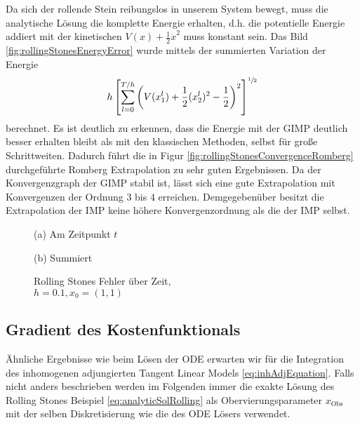 Da sich der rollende Stein reibungslos in unserem System bewegt, muss die analytische Lösung die komplette Energie erhalten, d.h. die potentielle Energie addiert mit der kinetischen $V(x) + \frac{1}{2}\dot x^2$ muss konstant sein. Das Bild \ref{fig:rollingStonesEnergyError} wurde mittels der summierten Variation der Energie 
\begin{equation}
 h \left[\sum_{l=0}^{T/h} \left( V(x_1^l) + \frac{1}{2} (x_2^l)^2 -\frac{1}{2}\right)^2\right]^{\sfrac{1}{2}}
 \label{eq:energyVariation}
\end{equation}
berechnet. Es ist deutlich zu erkennen, dass die Energie mit der GIMP deutlich besser erhalten bleibt als mit den klassischen Methoden, selbst für große Schrittweiten.
Dadurch führt die in Figur \ref{fig:rollingStonesConvergenceRomberg} durchgeführte Romberg Extrapolation zu sehr guten Ergebnissen. Da der Konvergenzgraph der GIMP stabil ist, lässt sich eine gute Extrapolation mit Konvergenzen der Ordnung 3 bis 4 erreichen. Demgegebenüber besitzt die Extrapolation der IMP keine höhere Konvergenzordnung als die der IMP selbst.
\begin{figure}[H]
\footnotesize 
\centering
\begin{minipage}[b]{0.49\linewidth}

\caption*{(a) Am Zeitpunkt $t$}\end{minipage}
\begin{minipage}[b]{0.49\linewidth}

\caption*{(b) Summiert}
\end{minipage}
\caption{Rolling Stones Fehler über Zeit, \\$h=0.1,x_0=(1,1)$}
\label{fig:rollingStonesEOT}

\end{figure}

\subsection{Gradient des Kostenfunktionals}
Ähnliche Ergebnisse wie beim Lösen der ODE erwarten wir für die Integration des inhomogenen adjungierten Tangent Linear Models \eqref{eq:inhAdjEquation}. Falls nicht anders beschrieben werden im Folgenden immer die exakte Lösung des Rolling Stones Beispiel \eqref{eq:analyticSolRolling} als Obervierungsparameter $x_{\text{Obs}}$ mit der selben Diskretisierung wie die des ODE Lösers verwendet.

